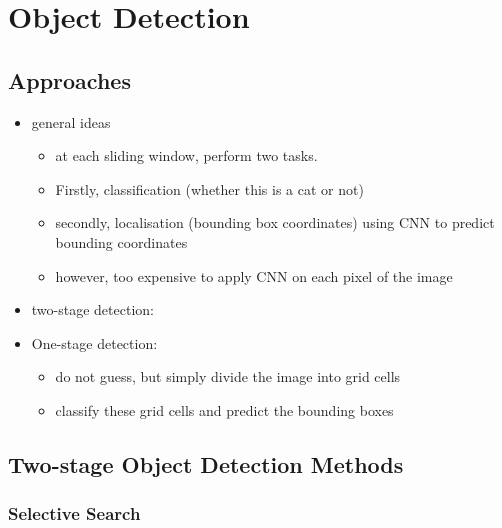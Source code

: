 \documentclass[twocolumn,landscape,10pt]{article}
\theoremstyle{definition}
\begin{document}
\section{Object Detection}

\subsection{Approaches}

\begin{itemize}
    \item general ideas
        \begin{itemize}
            \item at each sliding window, perform two tasks.
            \item Firstly, classification (whether this is a cat or not)
            \item secondly, localisation (bounding box coordinates) using CNN to
                predict bounding coordinates
            \item however, too expensive to apply CNN on each pixel of the image
        \end{itemize} 
    \item two-stage detection:
    \item One-stage detection:
        \begin{itemize}
            \item do not guess, but simply divide the image into grid cells
            \item classify these grid cells and predict the bounding boxes
        \end{itemize} 
\end{itemize} 

\subsection{Two-stage Object Detection Methods}

\subsubsection{Selective Search}
\end{document}
